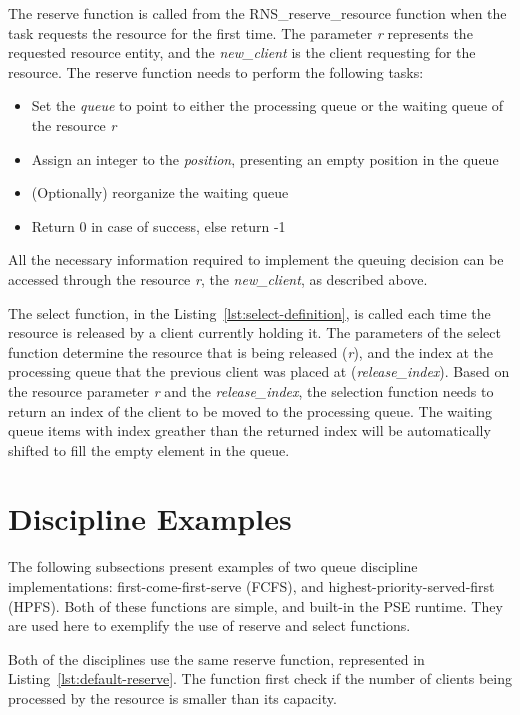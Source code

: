 The reserve function is called from the RNS\_reserve\_resource function when the task requests  the resource for the first time. The parameter \emph{r} represents the requested resource entity, and the \emph{new\_client} is the client requesting for the resource. The reserve function needs to perform the following tasks:

\begin{itemize}
\item Set the \emph{queue} to point to either the processing queue or the waiting queue of the resource \emph{r}
\item Assign an integer to the \emph{position}, presenting an empty position in the queue
\item (Optionally) reorganize the waiting queue
\item Return 0 in case of success, else return -1
\end{itemize}

All the necessary information required to implement the queuing decision can be accessed through the resource \emph{r}, the \emph{new\_client}, as described above.

The select function, in the Listing~\ref{lst:select-definition}, is called each time the resource is released by a client currently holding it. The parameters of the select function determine the resource that is being released (\emph{r}), and the index at the processing queue that the previous client was placed at (\emph{release\_index}). Based on the resource parameter \emph{r} and the \emph{release\_index}, the selection function needs to return an index of the client to be moved to the processing queue. The waiting queue items with index greather than the returned index will be automatically shifted to fill the empty element in the queue.



\section{Discipline Examples}
The following subsections present examples of two queue discipline implementations: first-come-first-serve (FCFS), and highest-priority-served-first (HPFS). Both of these functions are simple, and built-in the PSE runtime. They are used here to exemplify  the use of reserve and select functions.

Both of the disciplines use the same reserve function, represented in Listing~\ref{lst:default-reserve}. The function first check if the number of clients being processed by the resource is smaller than its capacity.

